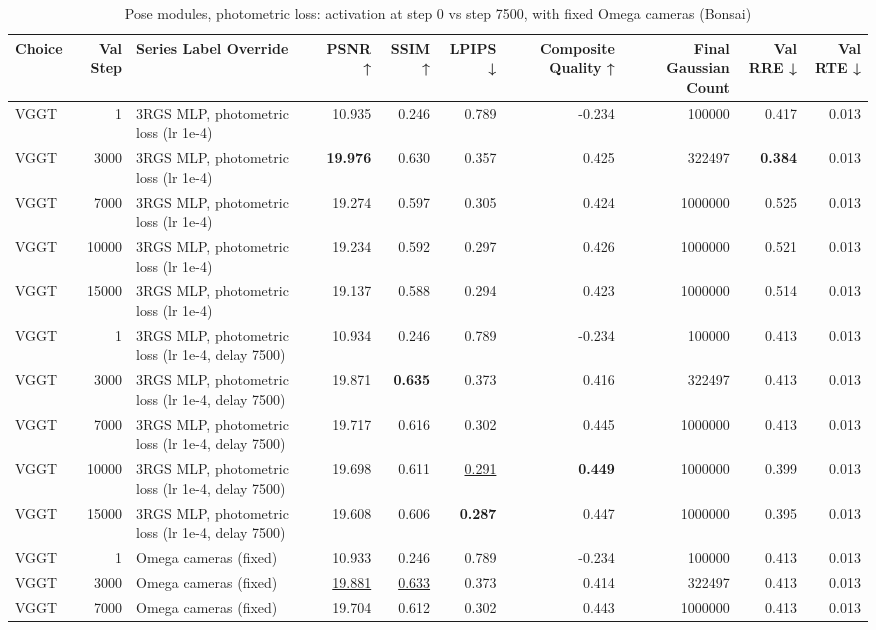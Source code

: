 \begin{table}[H]
\caption{\ifdefined\customcaption \customcaption \else Pose modules, photometric loss: activation at step 0 vs step 7500, with fixed Omega cameras (Bonsai) \fi}
\label{tab:111_omega_photo_delay_modules_bonsai}
\centering
\tiny
\begin{tabular}{lrlrrrrrrr}
\toprule
Choice & Val Step & Series Label Override & PSNR ↑ & SSIM ↑ & LPIPS ↓ & Composite Quality ↑ & Final Gaussian Count & Val RRE ↓ & Val RTE ↓ \\
\midrule
VGGT & 1 & 3RGS MLP, photometric loss (lr 1e-4) & 10.935 & 0.246 & 0.789 & -0.234 & 100000 & 0.417 & 0.013 \\
VGGT & 3000 & 3RGS MLP, photometric loss (lr 1e-4) & \textbf{19.976} & 0.630 & 0.357 & 0.425 & 322497 & \textbf{0.384} & 0.013 \\
VGGT & 7000 & 3RGS MLP, photometric loss (lr 1e-4) & 19.274 & 0.597 & 0.305 & 0.424 & 1000000 & 0.525 & 0.013 \\
VGGT & 10000 & 3RGS MLP, photometric loss (lr 1e-4) & 19.234 & 0.592 & 0.297 & 0.426 & 1000000 & 0.521 & 0.013 \\
VGGT & 15000 & 3RGS MLP, photometric loss (lr 1e-4) & 19.137 & 0.588 & 0.294 & 0.423 & 1000000 & 0.514 & 0.013 \\
VGGT & 1 & 3RGS MLP, photometric loss (lr 1e-4, delay 7500) & 10.934 & 0.246 & 0.789 & -0.234 & 100000 & 0.413 & 0.013 \\
VGGT & 3000 & 3RGS MLP, photometric loss (lr 1e-4, delay 7500) & 19.871 & \textbf{0.635} & 0.373 & 0.416 & 322497 & 0.413 & 0.013 \\
VGGT & 7000 & 3RGS MLP, photometric loss (lr 1e-4, delay 7500) & 19.717 & 0.616 & 0.302 & 0.445 & 1000000 & 0.413 & 0.013 \\
VGGT & 10000 & 3RGS MLP, photometric loss (lr 1e-4, delay 7500) & 19.698 & 0.611 & \underline{0.291} & \textbf{0.449} & 1000000 & 0.399 & 0.013 \\
VGGT & 15000 & 3RGS MLP, photometric loss (lr 1e-4, delay 7500) & 19.608 & 0.606 & \textbf{0.287} & 0.447 & 1000000 & 0.395 & 0.013 \\
VGGT & 1 & Omega cameras (fixed) & 10.933 & 0.246 & 0.789 & -0.234 & 100000 & 0.413 & 0.013 \\
VGGT & 3000 & Omega cameras (fixed) & \underline{19.881} & \underline{0.633} & 0.373 & 0.414 & 322497 & 0.413 & 0.013 \\
VGGT & 7000 & Omega cameras (fixed) & 19.704 & 0.612 & 0.302 & 0.443 & 1000000 & 0.413 & 0.013 \\

\end{tabular}
\end{table}
